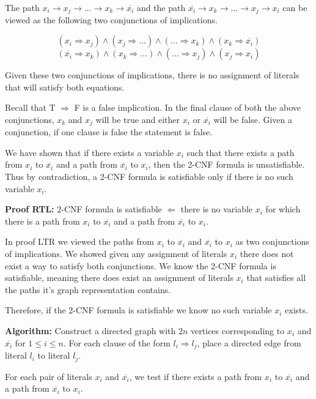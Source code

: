 \documentclass[11pt]{article}
\newcommand\algorith{\vspace{.10in}\textbf{Algorithm: }}
\begin{document}
The path $x_i \rightarrow x_j \rightarrow ... \rightarrow x_k \rightarrow \overline{x_i}$ and the path $\overline{x_i} \rightarrow x_k \rightarrow ... \rightarrow x_j \rightarrow x_i$ can be viewed as the following two conjunctions of implications.

$$(x_i \Rightarrow x_j) \land (x_j \Rightarrow ...) \land (... \Rightarrow x_k) \land (x_k \Rightarrow \overline{x_i})$$
$$(\overline{x_i} \Rightarrow x_k) \land (x_k \Rightarrow ...) \land (... \Rightarrow x_j) \land (x_j \Rightarrow x_i)$$

Given these two conjunctions of implications, there is no assignment of literals that will satisfy both equations.

Recall that T $\Rightarrow$ F is a false implication. In the final clause of both the above conjunctions, $x_k$ and $x_j$ will be true and either $x_i$ or $\overline{x_i}$ will be false. Given a conjunction, if one clause is false the statement is false.

We have shown that if there exists a variable $x_i$ such that there exists a path from $x_i$ to $\overline{x_i}$ and a path from $\overline{x_i}$ to $x_i$, then the 2-CNF formula is unsatisfiable. Thus by contradiction, a 2-CNF formula is satisfiable only if there is no such variable $x_i$.

\textbf{Proof RTL:} 2-CNF formula is satisfiable $\Leftarrow$ there is no variable $x_i$ for which there is a path from $x_i$ to $\overline{x_i}$ and a path from $\overline{x_i}$ to $x_i$.

In proof LTR we viewed the paths from $x_i$ to $\overline{x_i}$ and $\overline{x_i}$ to $x_i$ as two conjunctions of implications. We showed given any assignment of literals $x_i$ there does not exist a way to satisfy both conjunctions. We know the 2-CNF formula is satisfiable, meaning there does exist an assignment of literals $x_i$ that satisfies all the paths it's graph representation contains.

Therefore, if the 2-CNF formula is satisfiable we know no such variable $x_i$ exists.

\algorith Construct a directed graph with $2n$ vertices corresponding to $x_i$ and $\overline{x_i}$ for $1 \leq i \leq n$. For each clause of the form $l_i \Rightarrow l_j$, place a directed edge from literal $l_i$ to literal $l_j$.
	
	For each pair of literals $x_i$ and $\overline{x_i}$, we test if there exists a path from $x_i$ to $\overline{x_i}$ and a path from $\overline{x_i}$ to $x_i$.
	
\end{document}
